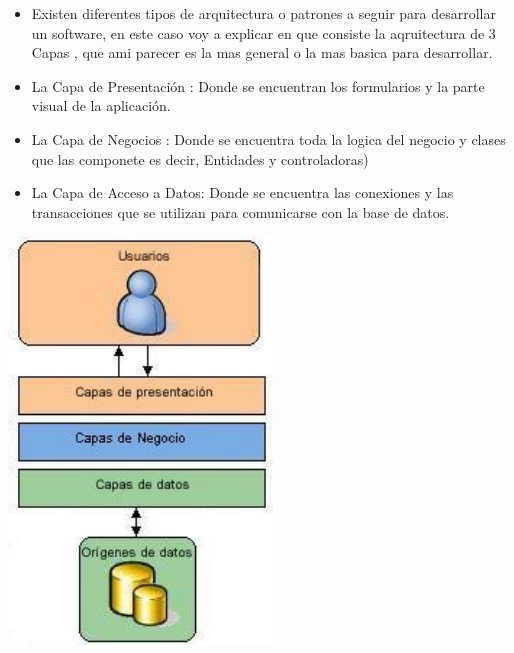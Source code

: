 \documentclass[preprint,12pt]{elsarticle}
\begin{document}
\begin{itemize}
\item Existen diferentes tipos de arquitectura o patrones a seguir para desarrollar un software, en este caso voy a explicar en que consiste la aqruitectura de 3 Capas , que ami parecer es la mas general o la mas basica para desarrollar.
	\item La Capa de Presentación : Donde se encuentran los formularios y la parte visual de la aplicación.
	\item 	La Capa de Negocios  : Donde se encuentra toda la logica del negocio y clases que las componete es decir, Entidades y controladoras)

	\item 	La Capa de Acceso a Datos: Donde se encuentra las conexiones y las transacciones que se utilizan para comunicarse con la base de datos.
	\end{itemize}
	\begin{center}
	\includegraphics[width=7cm]{./imagen/capas} 
	\end{center}
\end{document}
